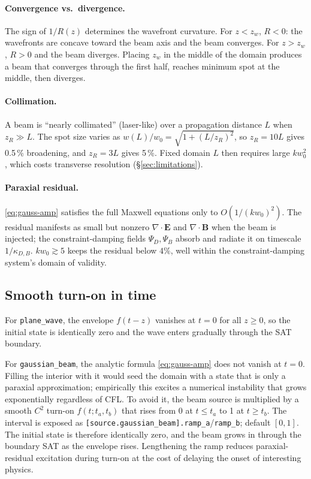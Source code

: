 \documentclass[11pt]{article}
\newcommand{\vE}{\mathbf{E}}
\newcommand{\vB}{\mathbf{B}}
\begin{document}
\paragraph{Convergence vs.\ divergence.}
The sign of $1/R(z)$ determines the wavefront curvature.  For
$z < z_w$, $R < 0$: the wavefronts are concave toward the beam
axis and the beam converges.  For $z > z_w$, $R > 0$ and the beam
diverges.  Placing $z_w$ in the middle of the domain produces a
beam that converges through the first half, reaches minimum spot
at the middle, then diverges.

\paragraph{Collimation.}
A beam is ``nearly collimated'' (laser-like) over a propagation
distance $L$ when $z_R \gg L$.  The spot size varies as
$w(L)/w_0 = \sqrt{1 + (L/z_R)^2}$, so $z_R = 10 L$ gives 0.5\,\%
broadening, and $z_R = 3 L$ gives 5\,\%.  Fixed domain $L$ then
requires large $k w_0^2$, which costs transverse resolution
(\S\ref{sec:limitations}).

\paragraph{Paraxial residual.}
\eqref{eq:gauss-amp} satisfies the full Maxwell equations only to
$O(1/(kw_0)^2)$.  The residual manifests as small but nonzero
$\nabla\cdot\vE$ and $\nabla\cdot\vB$ when the beam is injected;
the constraint-damping fields $\Psi_D, \Psi_B$ absorb and radiate
it on timescale $1/\kappa_{D,B}$.  $kw_0 \gtrsim 5$ keeps the
residual below $4\%$, well within the constraint-damping system's
domain of validity.

\subsection{Smooth turn-on in time}

For \texttt{plane\_wave}, the envelope $f(t-z)$ vanishes at $t=0$
for all $z\geq 0$, so the initial state is identically zero and
the wave enters gradually through the SAT boundary.

For \texttt{gaussian\_beam}, the analytic formula
\eqref{eq:gauss-amp} does not vanish at $t = 0$.  Filling the
interior with it would seed the domain with a state that is only
a paraxial approximation; empirically this excites a numerical
instability that grows exponentially regardless of CFL.  To avoid
it, the beam source is multiplied by a smooth $C^2$ turn-on
$f(t; t_a, t_b)$ that rises from 0 at $t \leq t_a$ to 1 at
$t \geq t_b$.  The interval is exposed as
\texttt{[source.gaussian\_beam].ramp\_a}/\texttt{ramp\_b};
default $[0,1]$.  The initial state is therefore identically
zero, and the beam grows in through the boundary SAT as the
envelope rises.  Lengthening the ramp reduces paraxial-residual
excitation during turn-on at the cost of delaying the onset of
interesting physics.
\end{document}
